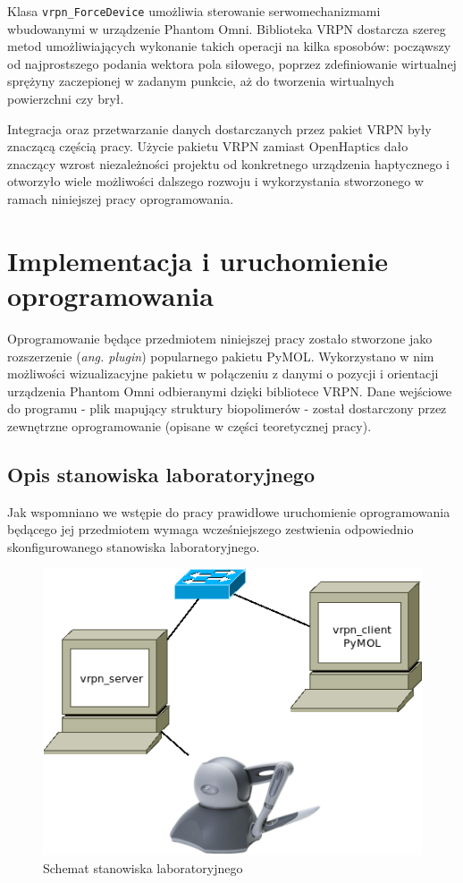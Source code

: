 \documentclass[licencjacka]{pracamgr}
\begin{document}
Klasa \texttt{vrpn\_ForceDevice} umożliwia sterowanie serwomechanizmami wbudowanymi w urządzenie Phantom Omni. Biblioteka VRPN dostarcza szereg metod umożliwiających wykonanie takich operacji na kilka sposobów: począwszy od najprostszego podania wektora pola siłowego, poprzez zdefiniowanie wirtualnej sprężyny zaczepionej w zadanym punkcie, aż do tworzenia wirtualnych powierzchni czy brył.

Integracja oraz przetwarzanie danych dostarczanych przez pakiet VRPN były znaczącą częścią pracy. Użycie pakietu VRPN zamiast OpenHaptics dało znaczący wzrost niezależności projektu od konkretnego urządzenia haptycznego i otworzyło wiele możliwości dalszego rozwoju i wykorzystania stworzonego w ramach niniejszej pracy oprogramowania. 

\chapter{Implementacja i uruchomienie oprogramowania}

Oprogramowanie będące przedmiotem niniejszej pracy zostało stworzone jako rozszerzenie (\textit{ang. plugin}) popularnego pakietu PyMOL. Wykorzystano w nim możliwości wizualizacyjne pakietu w połączeniu z danymi o pozycji i orientacji urządzenia Phantom Omni odbieranymi dzięki bibliotece VRPN. Dane wejściowe do programu - plik mapujący struktury biopolimerów - został dostarczony przez zewnętrzne oprogramowanie (opisane w części teoretycznej pracy).

\section{Opis stanowiska laboratoryjnego}
Jak wspomniano we wstępie do pracy prawidłowe uruchomienie oprogramowania będącego jej przedmiotem wymaga wcześniejszego zestwienia odpowiednio skonfigurowanego stanowiska laboratoryjnego. 

\begin{figure}[H]
\centering
\includegraphics[scale=0.6,center]{stanowisko}
\caption{Schemat stanowiska laboratoryjnego}
\end{figure}
\end{document}
